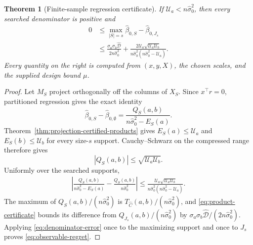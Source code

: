 \documentclass[a4paper,11pt,english]{article}
\newtheorem{theorem}{Theorem}[section]
\begin{document}
\begin{theorem}[Finite-sample regression certificate]
\label{thm:observable-regret}
If $\mathcal U_a<n\hat\sigma_0^2$, then every searched denominator is
positive and
\begin{equation}\label{eq:observable-regret}
\begin{split}
        0&\le
        \max_{|S|=s}\hat\beta_{0,S}
        -\hat\beta_{0,J_s}\\
        &\le
        \frac{\sigma_a\sigma_b\hat{\mathcal D}}
        {2n\hat\sigma_0^2}
        +\frac{2\mathcal U_a\sqrt{\mathcal U_a\mathcal U_b}}
        {n\hat\sigma_0^2
        (n\hat\sigma_0^2-\mathcal U_a)}.
\end{split}
\end{equation}
Every quantity on the right is computed from $(x,y,X)$, the chosen
scales, and the supplied design bound $\mu$.
\end{theorem}

\begin{proof}
Let $M_S$ project orthogonally off the columns of $X_S$.  Since
$x^\top\hat r=0$, partitioned regression gives the exact identity
\begin{equation}\label{eq:exact-empirical-ratio}
        \hat\beta_{0,S}-\hat\beta_{0,\emptyset}
        =\frac{Q_S(a,b)}{n\hat\sigma_0^2-E_S(a)}.
\end{equation}
Theorem~\ref{thm:projection-certified-products} gives
$E_S(a)\le\mathcal U_a$ and $E_S(b)\le\mathcal U_b$ for every
size-$s$ support.  Cauchy--Schwarz on the compressed range therefore
gives
\begin{equation*}
        |Q_S(a,b)|\le\sqrt{\mathcal U_a\mathcal U_b}.
\end{equation*}
Uniformly over the searched supports,
\begin{equation}\label{eq:denominator-error}
\begin{split}
        \left|
        \frac{Q_S(a,b)}{n\hat\sigma_0^2-E_S(a)}
        -\frac{Q_S(a,b)}{n\hat\sigma_0^2}
        \right|
        \le
        \frac{\mathcal U_a\sqrt{\mathcal U_a\mathcal U_b}}
        {n\hat\sigma_0^2
        (n\hat\sigma_0^2-\mathcal U_a)}.
\end{split}
\end{equation}
The maximum of $Q_S(a,b)/(n\hat\sigma_0^2)$ is
$T_{\hat C}(a,b)/(n\hat\sigma_0^2)$, and
\eqref{eq:product-certificate} bounds its difference from
$Q_{J_s}(a,b)/(n\hat\sigma_0^2)$ by
$\sigma_a\sigma_b\hat{\mathcal D}/
(2n\hat\sigma_0^2)$.  Applying
\eqref{eq:denominator-error} once to the maximizing support and once to
$J_s$ proves \eqref{eq:observable-regret}.
\end{proof}
\end{document}

